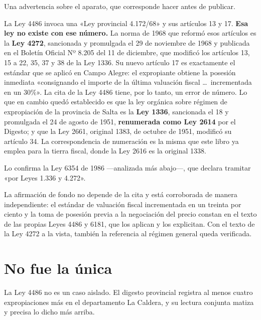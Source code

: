 \begin{cautela}
Una advertencia sobre el aparato, que corresponde hacer antes de publicar.

La Ley 4486 invoca una «Ley provincial 4.172/68» y sus artículos 13 y 17. \textbf{Esa ley no existe con ese número.} La norma de 1968 que reformó esos artículos es la \textbf{Ley 4272}, sancionada y promulgada el 29 de noviembre de 1968 y publicada en el Boletín Oficial Nº 8.205 del 11 de diciembre, que modificó los artículos 13, 15 a 22, 35, 37 y 38 de la Ley 1336. Su nuevo artículo 17 es exactamente el estándar que se aplicó en Campo Alegre: el expropiante obtiene la posesión inmediata «consignando el importe de la última valuación fiscal \ldots\ incrementada en un 30\%». La cita de la Ley 4486 tiene, por lo tanto, un error de número. Lo que en cambio quedó establecido es que la ley orgánica sobre régimen de expropiación de la provincia de Salta es la \textbf{Ley 1336}, sancionada el 18 y promulgada el 24 de agosto de 1951, \textbf{renumerada como Ley 2614} por el Digesto; y que la Ley 2661, original 1383, de octubre de 1951, modificó su artículo 34. La correspondencia de numeración es la misma que este libro ya emplea para la tierra fiscal, donde la Ley 2616 es la original 1338.

Lo confirma la Ley 6354 de 1986 ---analizada más abajo---, que declara tramitar «por Leyes 1.336 y 4.272».

La afirmación de fondo no depende de la cita y está corroborada de manera independiente: el estándar de valuación fiscal incrementada en un treinta por ciento y la toma de posesión previa a la negociación del precio constan en el texto de las propias Leyes 4486 y 6181, que los aplican y los explicitan. Con el texto de la Ley 4272 a la vista, también la referencia al régimen general queda verificada.
\end{cautela}

\section{No fue la única}

La Ley 4486 no es un caso aislado. El digesto provincial registra al menos cuatro expropiaciones más en el departamento La Caldera, y su lectura conjunta matiza y precisa lo dicho más arriba.

